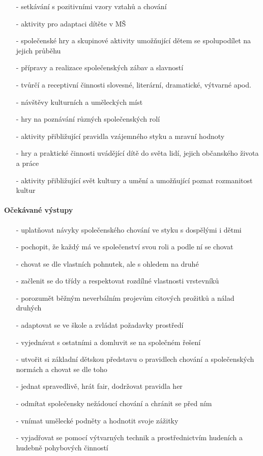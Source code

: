 					\begin{itemize}
					\setlength\itemsep{-2mm}
						\item[-]setkávání s pozitivními vzory vztahů a chování
						\item[-]aktivity pro adaptaci dítěte v MŠ
						\item[-]společenské hry a skupinové aktivity umožňující dětem se spolupodílet na jejich průběhu
						\item[-]přípravy a realizace společenských zábav a slavností
						\item[-]tvůrčí a receptivní činnosti slovesné, literární, dramatické, výtvarné apod.
						\item[-]návštěvy kulturních a uměleckých míst
						\item[-]hry na poznávání různých společenských rolí
						\item[-]aktivity přibližující pravidla vzájemného styku a mravní hodnoty
						\item[-]hry a praktické činnosti uvádějící dítě do světa lidí, jejich občanského života a práce
						\item[-]aktivity přibližující svět kultury a umění a umožňující poznat rozmanitost kultur
					\end{itemize}
					
					\paragraph{Očekávané výstupy}

					\begin{itemize}
					\setlength\itemsep{-2mm}
						\item[-]uplatňovat návyky společenského chování ve styku s dospělými i dětmi
						\item[-]pochopit, že každý má ve společenství svou roli a podle ní se chovat
						\item[-]chovat se dle vlastních pohnutek, ale s ohledem na druhé
						\item[-]začlenit se do třídy a respektovat rozdílné vlastnosti vrstevníků
						\item[-]porozumět běžným neverbálním projevům citových prožitků a nálad druhých
						\item[-]adaptovat se ve škole a zvládat požadavky prostředí
						\item[-]vyjednávat s ostatními a domluvit se na společném řešení
						\item[-]utvořit si základní dětskou představu o pravidlech chování a společenských normách a chovat se dle toho
						\item[-]jednat spravedlivě, hrát fair, dodržovat pravidla her 
						\item[-]odmítat společensky nežádoucí chování a chránit se před ním
						\item[-]vnímat umělecké podněty a hodnotit svoje zážitky
						\item[-]vyjadřovat se pomocí výtvarných technik a prostřednictvím hudeních a hudebně pohybových činností
					\end{itemize}

